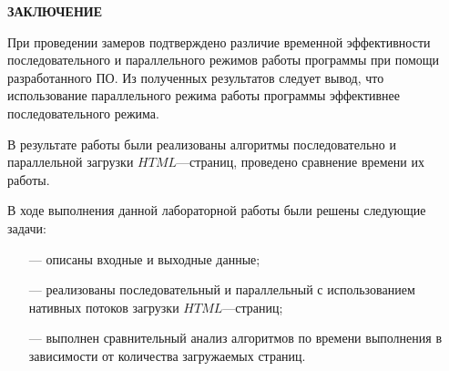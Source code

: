 \begin{center}
    \textbf{ЗАКЛЮЧЕНИЕ}
\end{center}

При проведении замеров подтверждено различие временной эффективности последовательного и параллельного режимов работы программы при помощи разработанного ПО. Из полученных результатов следует вывод, что использование параллельного режима работы программы эффективнее последовательного режима.

В результате работы были реализованы алгоритмы последовательно и
параллельной загрузки $HTML$---страниц, проведено сравнение времени их работы.

\vspace{5mm}

В ходе выполнения данной лабораторной работы были решены следующие задачи:
\begin{itemize}
	\item[---] описаны входные и выходные данные;
    \item[---] реализованы последовательный и параллельный с использованием нативных потоков загрузки  $HTML$---страниц;
    \item[---] выполнен сравнительный анализ алгоритмов по времени выполнения в зависимости от количества загружаемых страниц.
\end{itemize}